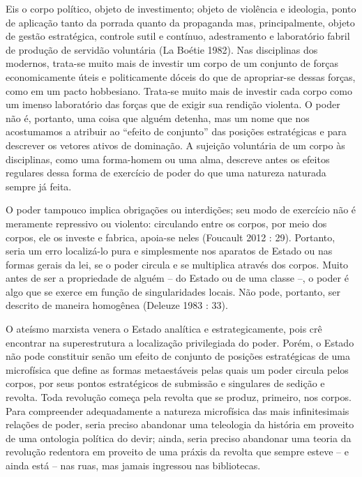 Eis o corpo político, objeto de investimento; objeto de violência e
ideologia, ponto de aplicação tanto da porrada quanto da propaganda mas,
principalmente, objeto de gestão estratégica, controle sutil e contínuo,
adestramento e laboratório fabril de produção de servidão voluntária (La
Boétie 1982). Nas disciplinas dos modernos, trata-se muito mais de
investir um corpo de um conjunto de forças economicamente úteis e
politicamente dóceis do que de apropriar-se dessas forças, como em um
pacto hobbesiano. Trata-se muito mais de investir cada corpo como um
imenso laboratório das forças que de exigir sua rendição violenta. O
poder não é, portanto, uma coisa que alguém detenha, mas um nome que nos
acostumamos a atribuir ao ``efeito de conjunto'' das posições
estratégicas e para descrever os vetores ativos de dominação. A sujeição
voluntária de um corpo às disciplinas, como uma forma-homem ou uma alma,
descreve antes os efeitos regulares dessa forma de exercício de poder do
que uma natureza naturada sempre já feita.

O poder tampouco implica obrigações ou interdições; seu modo de
exercício não é meramente repressivo ou violento: circulando entre os
corpos, por meio dos corpos, ele os investe e fabrica, apoia-se neles
(Foucault 2012 : 29). Portanto, seria um erro localizá-lo pura e
simplesmente nos aparatos de Estado ou nas formas gerais da lei, se o
poder circula e se multiplica através dos corpos. Muito antes de ser a
propriedade de alguém -- do Estado ou de uma classe --, o poder é algo
que se exerce em função de singularidades locais. Não pode, portanto,
ser descrito de maneira homogênea (Deleuze 1983 : 33).

O ateísmo marxista venera o Estado analítica e estrategicamente, pois
crê encontrar na superestrutura a localização privilegiada do poder.
Porém, o Estado não pode constituir senão um efeito de conjunto de
posições estratégicas de uma microfísica que define as formas
metaestáveis pelas quais um poder circula pelos corpos, por seus pontos
estratégicos de submissão e singulares de sedição e revolta. Toda
revolução começa pela revolta que se produz, primeiro, nos corpos. Para
compreender adequadamente a natureza microfísica das mais infinitesimais
relações de poder, seria preciso abandonar uma teleologia da história em
proveito de uma ontologia política do devir; ainda, seria preciso
abandonar uma teoria da revolução redentora em proveito de uma práxis da
revolta que sempre esteve -- e ainda está -- nas ruas, mas jamais
ingressou nas bibliotecas.

